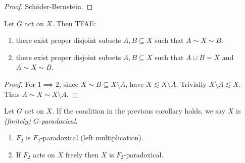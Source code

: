 \documentclass[a4paper]{article}
\begin{document}
\begin{proof}
  Schöder-Bernstein.
  \iffalse
  Let \(f: A \to B_1, g: A_1 \to B\) be the realisations. Define inductively
  \begin{align*}
    C_0 &= A \setminus A_1 \\
    C_{n + 1} &= g^{-1} f(C_n)
  \end{align*}
  and let \(C = \bigcup_{n = 0}^\infty C_n\). If \(a \in A \setminus C\) then \(a \notin C_n\) for all \(n \geq 0\), so \(g(a) \notin f(C_n)\). Thus \(g(A \setminus C) = B \setminus f(C)\). Similarly \(B \setminus f(C) \subseteq g(A\setminus C)\). Thus \(A \setminus C \sim_g B \setminus f(C)\). Since \(C \sim f(C)\) we get \(A \sim B\).
  \fi
\end{proof}

\begin{corollary}
  Let \(G\) act on \(X\). Then TFAE:
  \begin{enumerate}
  \item there exist proper disjoint subsets \(A, B \subseteq X\) such that \(A \sim X \sim B\).
  \item there exist proper disjoint subsets \(A, B \subseteq X\) such that \(A \cup B = X\) and \(A \sim X \sim B\).
  \end{enumerate}
\end{corollary}

\begin{proof}
  For \(1 \implies 2\), since \(X \sim B \subseteq X \setminus A\), have \(X \lesssim X \setminus A\). Trivially \(X \setminus A \lesssim X\). Thus \(A \sim X \sim X \setminus A\).
\end{proof}

\begin{definition}[\(G\)-paradoxical]
  Let \(G\) act on \(X\). If the condition in the previous corollary holds, we say \(X\) is \emph{(finitely) \(G\)-paradoxical}.
\end{definition}

\begin{proposition}\leavevmode
  \begin{enumerate}
  \item \(F_2\) is \(F_2\)-paradoxical (left multiplication).
  \item If \(F_2\) acts on \(X\) freely then \(X\) is \(F_2\)-paradoxical.
  \end{enumerate}
\end{proposition}
\end{document}
